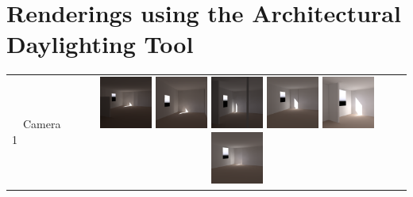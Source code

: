 \documentclass[landscape,20pt]{sciposter}
\begin{document}
\begin{minipage}[t]{17in}
\section*{Renderings using the Architectural Daylighting Tool}
\begin{tabular}{lc}
%
\begin{sideways}~~Camera 1\end{sideways}&
  \includegraphics[width=0.158\textwidth]{../gi2012_userstudy/images/renderings/ground_truth/mrc331_camera_chris_march.png}
  \includegraphics[width=0.158\textwidth]{../gi2012_userstudy/images/renderings/renovations/065_camera_chris_march.png}
  \includegraphics[width=0.158\textwidth]{../gi2012_userstudy/images/renderings/renovations/038_camera_chris_march.png}
  \includegraphics[width=0.158\textwidth]{../gi2012_userstudy/images/renderings/renovations/042_camera_chris_march.png}
  \includegraphics[width=0.158\textwidth]{../gi2012_userstudy/images/renderings/renovations/031_camera_chris_march.png}
  \includegraphics[width=0.158\textwidth]{../gi2012_userstudy/images/renderings/renovations/014_camera_chris_march.png}

\end{tabular}
\end{minipage}
\end{document}
